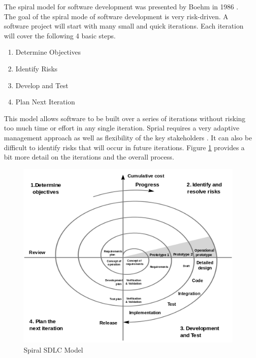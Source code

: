 \documentclass[SDSUThesis.tex]{subfiles}
\begin{document}
        The spiral model for software development was presented by Boehm in 1986
        \cite{Boehm1986, Boehm1988}. 
        The goal of the spiral mode of software development is very risk-driven.
        A software project will start with many small and quick iterations. 
        Each iteration will cover the following 4 basic steps. 
        \begin{enumerate}
            \item Determine Objectives
            \item Identify Risks
            \item Develop and Test
            \item Plan Next Iteration
        \end{enumerate}
        This model allows software to be built over a series of iterations
        without risking too much time or effort in any single iteration.
        Sprial requires a very adaptive management approach
        as well as flexibility of the key stakeholders \cite{Ruparelia2010}.
        It can also be difficult to identify risks that will occur in future
        iterations.
        Figure \ref{fig:spiral} provides a bit more detail on the iterations
        and the overall process. 
        \begin{figure}[here]
            \centering
            \includegraphics[scale=.5]{spiral_model.png}
            \caption[Spiral SDLC Model]{Spiral SDLC Model \cite{Boehm2000} }
            \label{fig:spiral}
        \end{figure}
        
\end{document}
